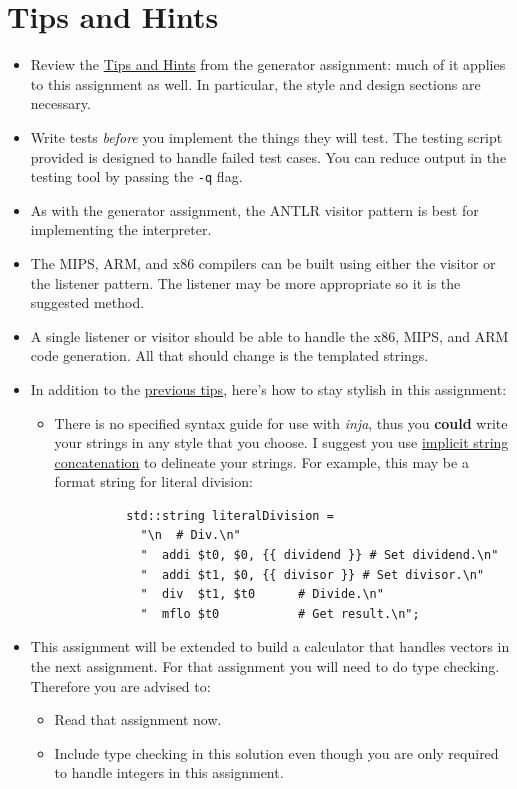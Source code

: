 \documentclass{article}
\newcommand{\code}[1]{\texttt{\textmd{#1}}}
\begin{document}
\section{Tips and Hints}
\begin{itemize}
  \item
    Review the \href{https://webdocs.cs.ualberta.ca/\%7Ec415/generator/}{Tips and Hints} from the
    generator assignment: much of it applies to this assignment as well. In particular, the
    style and design sections are necessary.
  \item
    Write tests \textit{before} you implement the things they will test. The testing script
    provided is designed to handle failed test cases. You can reduce output in the testing tool by
    passing the \code{-q} flag.
  \item
    As with the generator assignment, the ANTLR visitor pattern is best for implementing the
    interpreter.
  \item
    The MIPS, ARM, and x86 compilers can be built using either the visitor or the listener pattern.
    The listener may be more appropriate so it is the suggested method.
  \item
    A single listener or visitor should be able to handle the x86, MIPS, and ARM code generation.
    All that should change is the templated strings.
  \item
    In addition to the \href{https://webdocs.cs.ualberta.ca/\%7Ec415/generator/}{previous tips},
    here's how to stay stylish in this assignment:
    \begin{itemize}
      \item
        There is no specified syntax guide for use with \textit{inja}, thus you \textbf{could}
        write your strings in any style that you choose. I suggest you use
        \href{https://softwareengineering.stackexchange.com/q/254984}{implicit string
        concatenation} to delineate your strings. For example, this may be a format string for
        literal division:
        \begin{lstlisting}
          std::string literalDivision =
            "\n  # Div.\n"
            "  addi $t0, $0, {{ dividend }} # Set dividend.\n"
            "  addi $t1, $0, {{ divisor }} # Set divisor.\n"
            "  div  $t1, $t0      # Divide.\n"
            "  mflo $t0           # Get result.\n";
        \end{lstlisting}
    \end{itemize}
  \item
    This assignment will be extended to build a calculator that handles vectors in the next
    assignment. For that assignment you will need to do type checking. Therefore you are advised
    to:
  \begin {itemize}
    \item
      Read that assignment now.
    \item
      Include type checking in this solution even though you are only required to handle integers
      in this assignment.
  \end {itemize}
\end{itemize}
\end{document}
